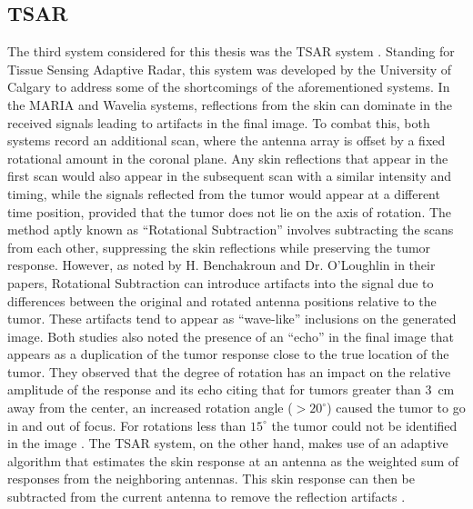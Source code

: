 \subsection{TSAR}
The third system considered for this thesis was the TSAR system \cite{e.c.fearMicrowaveBreastImaging2013}. Standing for
Tissue Sensing Adaptive Radar, this system was developed by the University of Calgary to address some of the
shortcomings of the aforementioned systems. In the MARIA and Wavelia systems, reflections from the skin can dominate in
the received signals leading to artifacts in the final image. To combat this, both systems record an additional scan,
where the antenna array is offset by a fixed rotational amount in the coronal plane. Any skin reflections that appear in
the first scan would also appear in the subsequent scan with a similar intensity and timing, while the signals reflected
from the tumor would appear at a different time position, provided that the tumor does not lie on the axis of rotation.
The method aptly known as ``Rotational Subtraction'' involves subtracting the scans from each other, suppressing the
skin reflections while preserving the tumor response. However, as noted by H. Benchakroun and Dr. O'Loughlin in their
papers, Rotational Subtraction can introduce artifacts into the signal due to differences between the original and
rotated antenna positions relative to the tumor. These artifacts tend to appear as ``wave-like'' inclusions on the
generated image. Both studies also noted the presence of an ``echo'' in the final image that appears as a duplication of
the tumor response close to the true location of the tumor. They observed that the degree of rotation has an impact on
the relative amplitude of the response and its echo citing that for tumors greater than $3$~cm away from the center, an
increased rotation angle ($ > 20^{\circ}$) caused the tumor to go in and out of focus. For rotations less than
$15^{\circ}$ the tumor could not be identified in the image \cite{h.benchakrounImpactRotationalArtefact2021,
d.oloughlinRotationalArtefactRemoval2020}. The TSAR system, on the other hand, makes use of an adaptive algorithm that
estimates the skin response at an antenna as the weighted sum of responses from the neighboring antennas. This skin
response can then be subtracted from the current antenna to remove the reflection artifacts
\cite{makladNeighborhoodBasedAlgorithmFacilitate2012}. 

